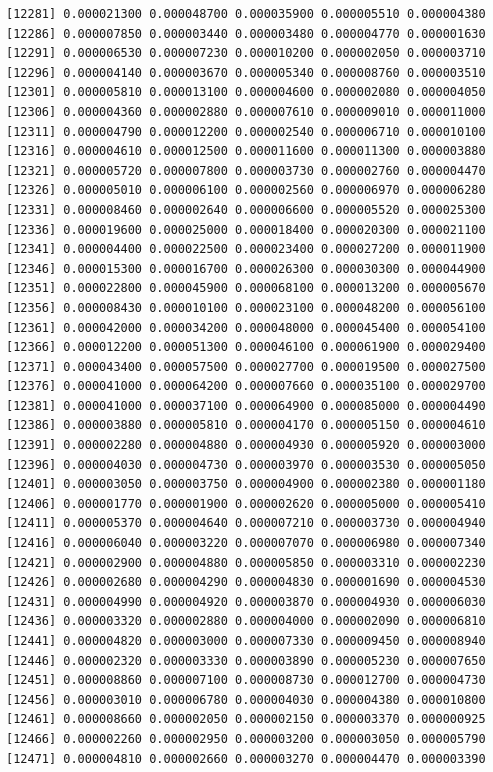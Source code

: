 \documentclass[]{article}
\begin{document}
\begin{verbatim}
[12281] 0.000021300 0.000048700 0.000035900 0.000005510 0.000004380
[12286] 0.000007850 0.000003440 0.000003480 0.000004770 0.000001630
[12291] 0.000006530 0.000007230 0.000010200 0.000002050 0.000003710
[12296] 0.000004140 0.000003670 0.000005340 0.000008760 0.000003510
[12301] 0.000005810 0.000013100 0.000004600 0.000002080 0.000004050
[12306] 0.000004360 0.000002880 0.000007610 0.000009010 0.000011000
[12311] 0.000004790 0.000012200 0.000002540 0.000006710 0.000010100
[12316] 0.000004610 0.000012500 0.000011600 0.000011300 0.000003880
[12321] 0.000005720 0.000007800 0.000003730 0.000002760 0.000004470
[12326] 0.000005010 0.000006100 0.000002560 0.000006970 0.000006280
[12331] 0.000008460 0.000002640 0.000006600 0.000005520 0.000025300
[12336] 0.000019600 0.000025000 0.000018400 0.000020300 0.000021100
[12341] 0.000004400 0.000022500 0.000023400 0.000027200 0.000011900
[12346] 0.000015300 0.000016700 0.000026300 0.000030300 0.000044900
[12351] 0.000022800 0.000045900 0.000068100 0.000013200 0.000005670
[12356] 0.000008430 0.000010100 0.000023100 0.000048200 0.000056100
[12361] 0.000042000 0.000034200 0.000048000 0.000045400 0.000054100
[12366] 0.000012200 0.000051300 0.000046100 0.000061900 0.000029400
[12371] 0.000043400 0.000057500 0.000027700 0.000019500 0.000027500
[12376] 0.000041000 0.000064200 0.000007660 0.000035100 0.000029700
[12381] 0.000041000 0.000037100 0.000064900 0.000085000 0.000004490
[12386] 0.000003880 0.000005810 0.000004170 0.000005150 0.000004610
[12391] 0.000002280 0.000004880 0.000004930 0.000005920 0.000003000
[12396] 0.000004030 0.000004730 0.000003970 0.000003530 0.000005050
[12401] 0.000003050 0.000003750 0.000004900 0.000002380 0.000001180
[12406] 0.000001770 0.000001900 0.000002620 0.000005000 0.000005410
[12411] 0.000005370 0.000004640 0.000007210 0.000003730 0.000004940
[12416] 0.000006040 0.000003220 0.000007070 0.000006980 0.000007340
[12421] 0.000002900 0.000004880 0.000005850 0.000003310 0.000002230
[12426] 0.000002680 0.000004290 0.000004830 0.000001690 0.000004530
[12431] 0.000004990 0.000004920 0.000003870 0.000004930 0.000006030
[12436] 0.000003320 0.000002880 0.000004000 0.000002090 0.000006810
[12441] 0.000004820 0.000003000 0.000007330 0.000009450 0.000008940
[12446] 0.000002320 0.000003330 0.000003890 0.000005230 0.000007650
[12451] 0.000008860 0.000007100 0.000008730 0.000012700 0.000004730
[12456] 0.000003010 0.000006780 0.000004030 0.000004380 0.000010800
[12461] 0.000008660 0.000002050 0.000002150 0.000003370 0.000000925
[12466] 0.000002260 0.000002950 0.000003200 0.000003050 0.000005790
[12471] 0.000004810 0.000002660 0.000003270 0.000004470 0.000003390

\end{verbatim}
\end{document}
